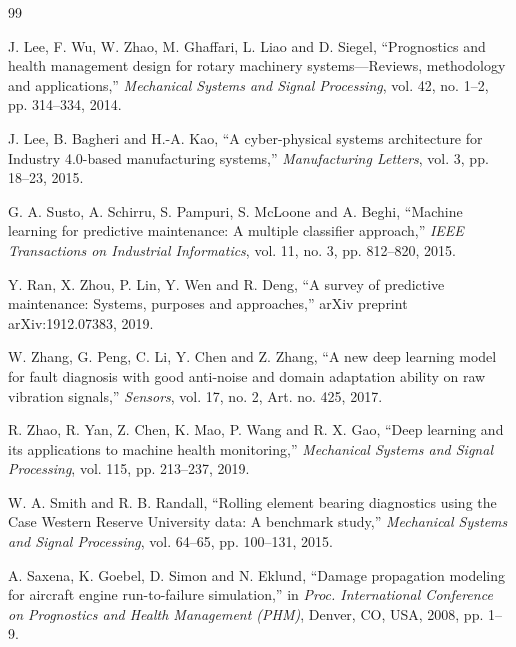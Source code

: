 \begingroup
\renewcommand{\chapter}[2]{}%
\begin{thebibliography}{99}
\setlength{\itemsep}{2pt}

 J. Lee, F. Wu, W. Zhao, M. Ghaffari, L. Liao and D. Siegel, ``Prognostics and health management design for rotary machinery systems---Reviews, methodology and applications,'' \emph{Mechanical Systems and Signal Processing}, vol. 42, no. 1--2, pp. 314--334, 2014.

 J. Lee, B. Bagheri and H.-A. Kao, ``A cyber-physical systems architecture for Industry 4.0-based manufacturing systems,'' \emph{Manufacturing Letters}, vol. 3, pp. 18--23, 2015.

 G. A. Susto, A. Schirru, S. Pampuri, S. McLoone and A. Beghi, ``Machine learning for predictive maintenance: A multiple classifier approach,'' \emph{IEEE Transactions on Industrial Informatics}, vol. 11, no. 3, pp. 812--820, 2015.

 Y. Ran, X. Zhou, P. Lin, Y. Wen and R. Deng, ``A survey of predictive maintenance: Systems, purposes and approaches,'' arXiv preprint arXiv:1912.07383, 2019.

 W. Zhang, G. Peng, C. Li, Y. Chen and Z. Zhang, ``A new deep learning model for fault diagnosis with good anti-noise and domain adaptation ability on raw vibration signals,'' \emph{Sensors}, vol. 17, no. 2, Art. no. 425, 2017.

 R. Zhao, R. Yan, Z. Chen, K. Mao, P. Wang and R. X. Gao, ``Deep learning and its applications to machine health monitoring,'' \emph{Mechanical Systems and Signal Processing}, vol. 115, pp. 213--237, 2019.

 W. A. Smith and R. B. Randall, ``Rolling element bearing diagnostics using the Case Western Reserve University data: A benchmark study,'' \emph{Mechanical Systems and Signal Processing}, vol. 64--65, pp. 100--131, 2015.

 A. Saxena, K. Goebel, D. Simon and N. Eklund, ``Damage propagation modeling for aircraft engine run-to-failure simulation,'' in \emph{Proc. International Conference on Prognostics and Health Management (PHM)}, Denver, CO, USA, 2008, pp. 1--9.


\end{thebibliography}

